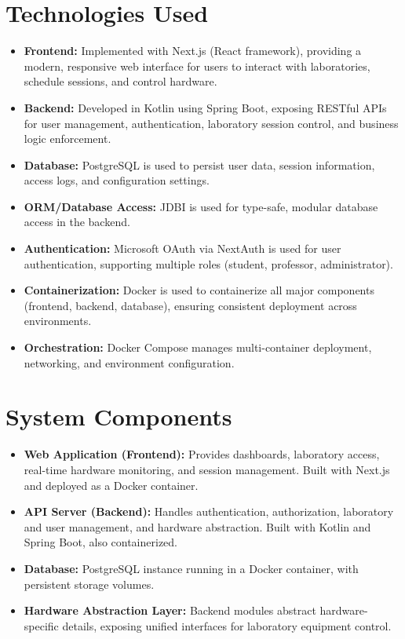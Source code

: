 \section{Technologies Used}

\begin{itemize}
    \item \textbf{Frontend:} Implemented with Next.js (React framework), providing a modern, responsive web interface for users to interact with laboratories, schedule sessions, and control hardware.
    \item \textbf{Backend:} Developed in Kotlin using Spring Boot, exposing RESTful APIs for user management, authentication, laboratory session control, and business logic enforcement.
    \item \textbf{Database:} PostgreSQL is used to persist user data, session information, access logs, and configuration settings.
    \item \textbf{ORM/Database Access:} JDBI is used for type-safe, modular database access in the backend.
    \item \textbf{Authentication:} Microsoft OAuth via NextAuth is used for user authentication, supporting multiple roles (student, professor, administrator).
    \item \textbf{Containerization:} Docker is used to containerize all major components (frontend, backend, database), ensuring consistent deployment across environments.
    \item \textbf{Orchestration:} Docker Compose manages multi-container deployment, networking, and environment configuration.
\end{itemize}

\section{System Components}

\begin{itemize}
    \item \textbf{Web Application (Frontend):} Provides dashboards, laboratory access, real-time hardware monitoring, and session management. Built with Next.js and deployed as a Docker container.
    \item \textbf{API Server (Backend):} Handles authentication, authorization, laboratory and user management, and hardware abstraction. Built with Kotlin and Spring Boot, also containerized.
    \item \textbf{Database:} PostgreSQL instance running in a Docker container, with persistent storage volumes.
    \item \textbf{Hardware Abstraction Layer:} Backend modules abstract hardware-specific details, exposing unified interfaces for laboratory equipment control.
\end{itemize}

